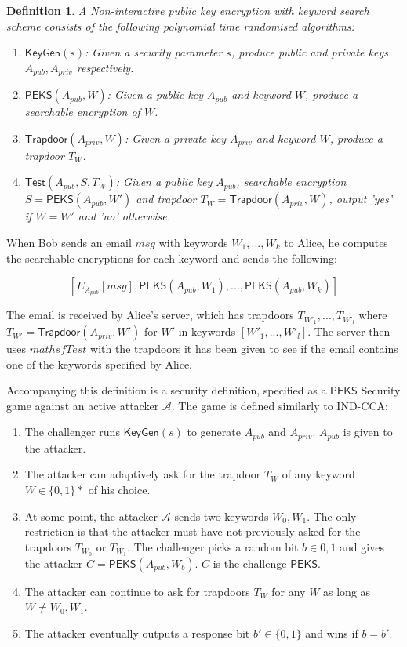 \documentclass[a4paper,11pt]{article}
\newtheorem{definition}{Definition}
\begin{document}
    \begin{definition}
        A Non-interactive public key encryption with keyword search scheme consists of the following polynomial time randomised algorithms:

        \begin{enumerate}
            \item $\mathsf{KeyGen}(s)$: Given a security parameter $s$, produce public and private keys $A_{pub}, A_{priv}$ respectively.
            \item $\mathsf{PEKS}(A_{pub}, W)$: Given a public key $A_{pub}$ and keyword $W$, produce a searchable encryption of $W$.
            \item $\mathsf{Trapdoor}(A_{priv}, W)$: Given a private key $A_{priv}$ and keyword $W$, produce a trapdoor $T_W$.
            \item $\mathsf{Test}(A_{pub}, S, T_W)$: Given a public key $A_{pub}$, searchable encryption $S = \mathsf{PEKS}(A_{pub}, W')$ and trapdoor $T_W = \mathsf{Trapdoor}(A_{priv}, W)$, output 'yes' if $W = W'$ and 'no' otherwise.
        \end{enumerate}
    \end{definition}

    When Bob sends an email $msg$ with keywords $W_1,...,W_k$ to Alice, he computes the searchable encryptions for each keyword and sends the following:

    $$[E_{A_{pub}}[msg], \mathsf{PEKS}(A_{pub}, W_1),...,\mathsf{PEKS}(A_{pub}, W_k)]$$

    The email is received by Alice's server, which has trapdoors $T_{W'_1},...,T_{W'_l}$ where $T_{W'} = \mathsf{Trapdoor}(A_{priv}, W')$ for $W'$ in keywords $[W'_1,...,W'_l]$. The server then uses $mathsf{Test}$ with the trapdoors it has been given to see if the email contains one of the keywords specified by Alice.

    Accompanying this definition is a security definition, specified as a $\mathsf{PEKS}$ Security game against an active attacker $\mathcal{A}$. The game is defined similarly to IND-CCA:

    \begin{enumerate}
        \item The challenger runs $\mathsf{KeyGen}(s)$ to generate $A_{pub}$ and $A_{priv}$. $A_{pub}$ is given to the attacker.
        \item The attacker can adaptively ask for the trapdoor $T_W$ of any keyword $W \in \{0,1\}*$ of his choice.
        \item At some point, the attacker $\mathcal{A}$ sends two keywords $W_0, W_1$. The only restriction is that the attacker must have not previously asked for the trapdoors $T_{W_0}$ or $T_{W_1}$. The challenger picks a random bit $b \in {0,1}$ and gives the attacker $C = \mathsf{PEKS}(A_{pub}, W_b)$. $C$ is the challenge $\mathsf{PEKS}$.
        \item The attacker can continue to ask for trapdoors $T_W$ for any $W$ as long as $W \neq W_0, W_1$.
        \item The attacker eventually outputs a response bit $b' \in \{0,1\}$ and wins if $b = b'$.
    \end{enumerate}
\end{document}
